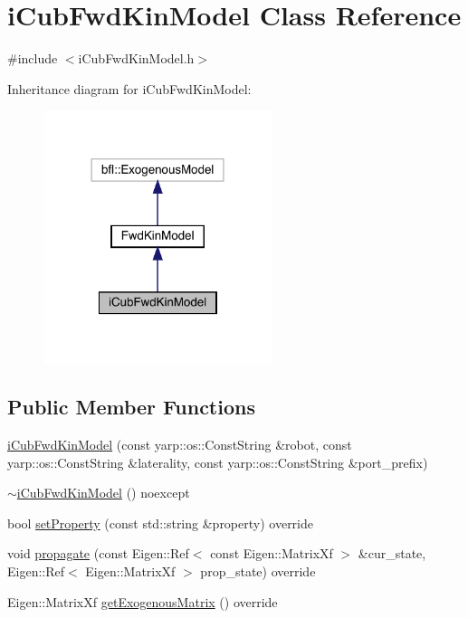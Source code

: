 \hypertarget{classiCubFwdKinModel}{}\section{i\+Cub\+Fwd\+Kin\+Model Class Reference}
\label{classiCubFwdKinModel}


{\ttfamily \#include $<$i\+Cub\+Fwd\+Kin\+Model.\+h$>$}



Inheritance diagram for i\+Cub\+Fwd\+Kin\+Model\+:
\nopagebreak
\begin{figure}[H]
\begin{center}
\leavevmode
\includegraphics[width=189pt]{classiCubFwdKinModel__inherit__graph}
\end{center}
\end{figure}
\subsection*{Public Member Functions}
\begin{DoxyCompactItemize}
\item 
\hyperlink{classiCubFwdKinModel_a97bd690952f48bb7d7994ff3d2d8b2b9}{i\+Cub\+Fwd\+Kin\+Model} (const yarp\+::os\+::\+Const\+String \&robot, const yarp\+::os\+::\+Const\+String \&laterality, const yarp\+::os\+::\+Const\+String \&port\+\_\+prefix)
\item 
\hyperlink{classiCubFwdKinModel_a60922638092ac5432739602e6541f9e4}{$\sim$i\+Cub\+Fwd\+Kin\+Model} () noexcept
\item 
bool \hyperlink{classiCubFwdKinModel_a2daa3bb3b2c458200dc487ac00929260}{set\+Property} (const std\+::string \&property) override
\item 
void \hyperlink{classFwdKinModel_a9461ff14a1ae8d05169e8f1c7a6237c7}{propagate} (const Eigen\+::\+Ref$<$ const Eigen\+::\+Matrix\+Xf $>$ \&cur\+\_\+state, Eigen\+::\+Ref$<$ Eigen\+::\+Matrix\+Xf $>$ prop\+\_\+state) override
\item 
Eigen\+::\+Matrix\+Xf \hyperlink{classFwdKinModel_ac8ed4e8a52f5ff33cc158c80c6cf083e}{get\+Exogenous\+Matrix} () override
\end{DoxyCompactItemize}
